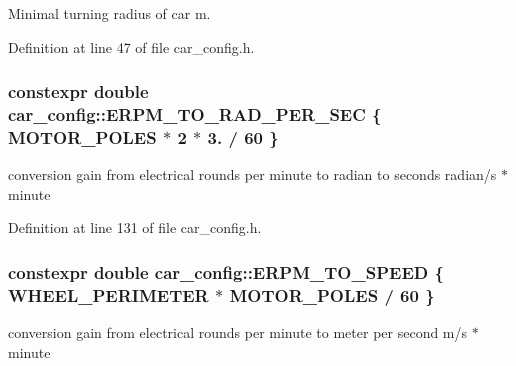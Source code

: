 Minimal turning radius of car  m. 



Definition at line 47 of file car\+\_\+config.\+h.

\subsubsection[{\texorpdfstring{E\+R\+P\+M\+\_\+\+T\+O\+\_\+\+R\+A\+D\+\_\+\+P\+E\+R\+\_\+\+S\+EC}{ERPM_TO_RAD_PER_SEC}}]{\setlength{\rightskip}{0pt plus 5cm}constexpr double car\+\_\+config\+::\+E\+R\+P\+M\+\_\+\+T\+O\+\_\+\+R\+A\+D\+\_\+\+P\+E\+R\+\_\+\+S\+EC \{ {\bf M\+O\+T\+O\+R\+\_\+\+P\+O\+L\+ES} $\ast$ 2 $\ast$ 3. / 60 \}}\hypertarget{namespacecar__config_a877c4a772a47f4737d9f03fe8a22e106}{}\label{namespacecar__config_a877c4a772a47f4737d9f03fe8a22e106}


conversion gain from electrical rounds per minute to radian to seconds  radian/s $\ast$ minute 



Definition at line 131 of file car\+\_\+config.\+h.

\subsubsection[{\texorpdfstring{E\+R\+P\+M\+\_\+\+T\+O\+\_\+\+S\+P\+E\+ED}{ERPM_TO_SPEED}}]{\setlength{\rightskip}{0pt plus 5cm}constexpr double car\+\_\+config\+::\+E\+R\+P\+M\+\_\+\+T\+O\+\_\+\+S\+P\+E\+ED \{ {\bf W\+H\+E\+E\+L\+\_\+\+P\+E\+R\+I\+M\+E\+T\+ER} $\ast$ {\bf M\+O\+T\+O\+R\+\_\+\+P\+O\+L\+ES} / 60 \}}\hypertarget{namespacecar__config_af33b95798967e7193927782fd91d36ce}{}\label{namespacecar__config_af33b95798967e7193927782fd91d36ce}


conversion gain from electrical rounds per minute to meter per second  m/s $\ast$ minute 



